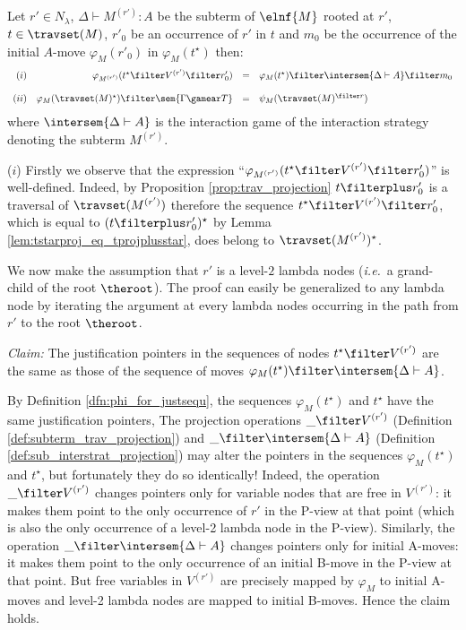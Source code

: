 \begin{lemma}
\label{lem:varphi_proj} Let $r'\in N_\lambda$, $\Delta \vdash
M^{(r')} : A$ be the subterm of $\elnf{M}$ rooted at $r'$,
$t\in\travset(M)$, $r'_0$ be an occurrence of $r'$ in $t$ and $m_0$
be the occurrence of the initial $A$-move $\varphi_M(r'_0)$ in
$\varphi_M(t^\star)$ then:
$$\begin{array}{rrcl}
(i)& \varphi_{M^{(r')}}(t^\star \filter V^{(r')} \filter r'_0) &=& \varphi_M(t^\star) \filter \intersem{\Delta \vdash A} \filter m_0 \\ \\
(ii) & \varphi_M(\travset(M)^\star) \filter \sem{\Gamma \gamear T} &=& \psi_M(\travset(M)^{\filter r})
\end{array}
$$
where $\intersem{\Delta \vdash A }$ is the interaction game of the interaction strategy denoting the subterm $M^{(r')}$.
\end{lemma}
\proof ($i$) Firstly we observe that the expression ``$\varphi_{M^{(r')}}(t^\star \filter V^{(r')} \filter r'_0)$'' is well-defined. Indeed, by Proposition \ref{prop:trav_projection} $t\filterplus r'_0$ is a traversal of $\travset(M^{(r')})$ therefore
the sequence $t^\star \filter V^{(r')} \filter r'_0$, which is equal to $(t\filterplus r'_0)^\star$ by Lemma \ref{lem:tstarproj_eq_tprojplusstar},
does belong to $\travset(M^{(r')})^\star$.

We now make the assumption that $r'$ is a level-$2$ lambda nodes ({\it i.e.}\ a grand-child of the root $\theroot$). The proof can easily
be generalized to any lambda node by iterating the argument at every lambda nodes occurring in the path from $r'$ to the root $\theroot$.


\emph{Claim:} The justification pointers in the sequences of nodes $t^\star \filter V^{(r')}$ are the same as those
of the sequence of moves $\varphi_M(t^\star) \filter \intersem{\Delta \vdash A }$.
 
By Definition \ref{dfn:phi_for_justsequ}, the sequences $\varphi_M(t^\star)$ and $t^\star$ have the same justification pointers,
The projection operations $\_ \filter V^{(r')}$ (Definition \ref{def:subterm_trav_projection})
and $\_ \filter \intersem{\Delta \vdash A}$ (Definition \ref{def:sub_interstrat_projection}) may alter the
pointers in the sequences $\varphi_M(t^\star)$ and $t^\star$, but fortunately they do so identically!
Indeed, the operation $\_ \filter V^{(r')}$ changes pointers only for variable nodes that are free in $V^{(r')}$: it makes them point to 
the only occurrence of $r'$ in the P-view at that point (which is also the only occurrence of a level-2 lambda node in the P-view).
Similarly, the operation $\_ \filter \intersem{\Delta \vdash A}$ changes pointers only for initial A-moves: it makes them point to
the only occurrence of an initial B-move in  the P-view at that point.
But free variables in $V^{(r')}$ are precisely mapped by $\varphi_M$ to initial A-moves and level-2 lambda nodes are mapped to
initial B-moves. Hence the claim holds.

